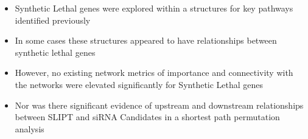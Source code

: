   \begin{itemize}
   \item Synthetic Lethal genes were explored within a  structures for key pathways identified previously 
   
   \bigskip
   
   \item In some cases these  structures appeared to have relationships between \gls{synthetic lethal} genes  
   
   \bigskip
   
   \item However, no existing network metrics of importance and connectivity with the networks were elevated significantly for Synthetic Lethal genes
   
   \bigskip
   
   \item Nor was there significant evidence of upstream and downstream relationships between SLIPT and \gls{siRNA} Candidates in a \gls{shortest path} permutation analysis
  \end{itemize}
  
\clearpage
\fi